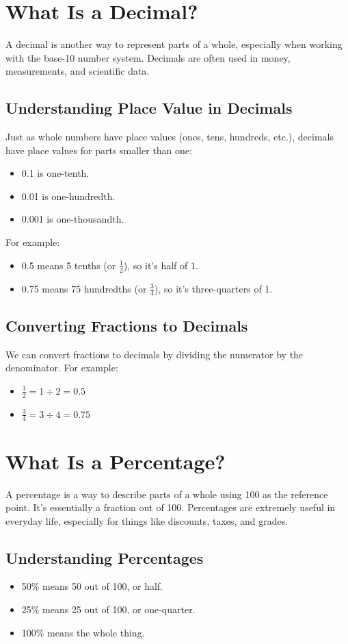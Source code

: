 \section{What Is a Decimal?}
A decimal is another way to represent parts of a whole, especially when working with the base-10 number system. Decimals are often used in money, measurements, and scientific data.

\subsection{Understanding Place Value in Decimals}
Just as whole numbers have place values (ones, tens, hundreds, etc.), decimals have place values for parts smaller than one:
\begin{itemize}
    \item 0.1 is one-tenth.
    \item 0.01 is one-hundredth.
    \item 0.001 is one-thousandth.
\end{itemize}

For example:
\begin{itemize}
    \item 0.5 means 5 tenths (or $\frac{1}{2}$), so it’s half of 1.
    \item 0.75 means 75 hundredths (or $\frac{3}{4}$), so it’s three-quarters of 1.
\end{itemize}

\subsection{Converting Fractions to Decimals}
We can convert fractions to decimals by dividing the numerator by the denominator. For example:
\begin{itemize}
    \item $\frac{1}{2} = 1 \div 2 = 0.5$
    \item $\frac{3}{4} = 3 \div 4 = 0.75$
\end{itemize}

\section{What Is a Percentage?}
A percentage is a way to describe parts of a whole using 100 as the reference point. It’s essentially a fraction out of 100. Percentages are extremely useful in everyday life, especially for things like discounts, taxes, and grades.

\subsection{Understanding Percentages}
\begin{itemize}
    \item 50\% means 50 out of 100, or half.
    \item 25\% means 25 out of 100, or one-quarter.
    \item 100\% means the whole thing.
\end{itemize}

